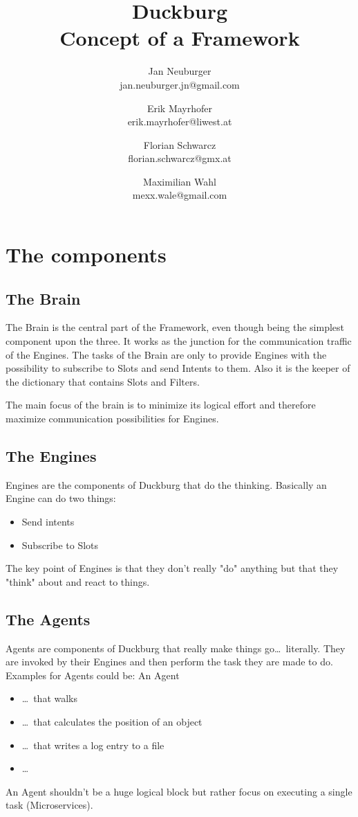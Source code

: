 \documentclass[12pt,a4paper]{article}
\author{    
    Jan Neuburger \\
    jan.neuburger.jn@gmail.com
    \and
    Erik Mayrhofer \\
    erik.mayrhofer@liwest.at
    \and
    Florian Schwarcz \\
    florian.schwarcz@gmx.at
    \and
    Maximilian Wahl \\
    mexx.wale@gmail.com
    }
\title{Duckburg\\[0.2em]Concept of a Framework}
\begin{document}
\maketitle
\newpage
\tableofcontents
\newpage
\section{The components}\label{sec:theComponents}
\subsection{The Brain}\label{subsec:theBrain}
The Brain is the central part of the Framework, even though being the simplest component upon the three.
It works as the junction for the communication traffic of the Engines.
The tasks of the Brain are only to provide Engines with the possibility to subscribe to Slots and send Intents to them.
Also it is the keeper of the dictionary that contains Slots and Filters.

The main focus of the brain is to minimize its logical effort and therefore maximize communication possibilities
for Engines.
\subsection{The Engines}\label{subsec:theEngines}
Engines are the components of Duckburg that do the thinking.
Basically an Engine can do two things:
\begin{itemize}
\item Send intents
\item Subscribe to Slots    
\end{itemize}
The key point of Engines is that they don't really "do" anything but that they "think" about and react to things.
\subsection{The Agents}\label{subsec:theAgents}
Agents are components of Duckburg that really make things go\dots\ literally.
They are invoked by their Engines and then perform the task they are made to do.
Examples for Agents could be: An Agent
\begin{itemize}
\item \dots\ that walks
\item \dots\ that calculates the position of an object
\item \dots\ that writes a log entry to a file
\item \dots\
\end{itemize}
An Agent shouldn't be a huge logical block but rather focus on executing a single task (Microservices). 
\end{document}

